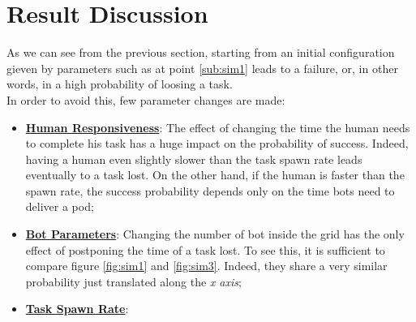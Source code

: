 \documentclass[10pt,a4paper]{article}
\begin{document}
	\section{Result Discussion}
			As we can see from the previous section, starting from an initial configuration gieven by parameters such as at point \ref{sub:sim1} leads to a failure, or, in other words, in a high probability of loosing a task.\\In order to avoid this, few parameter changes are made:
			\begin{itemize}
				\item {\textbf{\underline{Human Responsiveness}}: The effect of changing the time the human needs to complete his task has a huge impact on the probability of success. Indeed, having a human even slightly slower than the task spawn rate leads eventually to a task lost. On the other hand, if the human is faster than the spawn rate, the success probability depends only on the time bots need to deliver a pod;}
				\item {\textbf{\underline{Bot Parameters}}: Changing the number of bot inside the grid has the only effect of postponing the time of a task lost. To see this, it is sufficient to compare figure \ref{fig:sim1} and \ref{fig:sim3}. Indeed, they share a very similar probability just translated along the \emph{x axis};}
				\item {\textbf{\underline{Task Spawn Rate}}:}
			\end{itemize}
		
\end{document}
